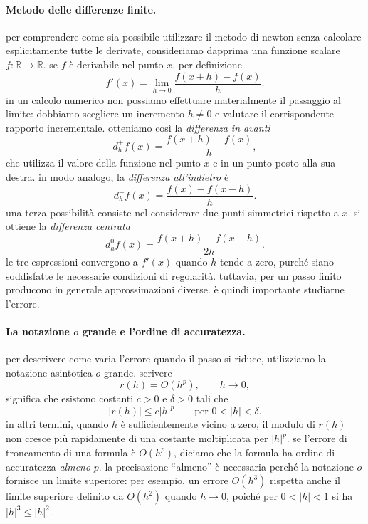 \paragraph{Metodo delle differenze finite.}
per comprendere come sia possibile utilizzare il metodo di newton senza calcolare esplicitamente tutte le derivate, consideriamo dapprima una funzione scalare $f:\mathbb{R}\to\mathbb{R}$. se $f$ è derivabile nel punto $x$, per definizione
\begin{equation*}
 f'(x)=\lim_{h\to 0}\frac{f(x+h)-f(x)}{h}.
 \label{eq:derivata_definizione}
\end{equation*}
in un calcolo numerico non possiamo effettuare materialmente il passaggio al limite: dobbiamo scegliere un incremento $h\neq 0$ e valutare il corrispondente rapporto incrementale. otteniamo così la \emph{differenza in avanti}
\begin{equation*}
 d_h^+f(x)=\frac{f(x+h)-f(x)}{h},
 \label{eq:diff_avanti}
\end{equation*}
che utilizza il valore della funzione nel punto $x$ e in un punto posto alla sua destra. in modo analogo, la \emph{differenza all'indietro} è
\begin{equation*}
 d_h^-f(x)=\frac{f(x)-f(x-h)}{h}.
 \label{eq:diff_indietro}
\end{equation*}
una terza possibilità consiste nel considerare due punti simmetrici rispetto a $x$. si ottiene la \emph{differenza centrata}
\begin{equation*}
 d_h^0f(x)=\frac{f(x+h)-f(x-h)}{2h}.
 \label{eq:diff_centrata}
\end{equation*}
le tre espressioni convergono a $f'(x)$ quando $h$ tende a zero, purché siano soddisfatte le necessarie condizioni di regolarità. tuttavia, per un passo finito producono in generale approssimazioni diverse. è quindi importante studiarne l'errore.

\paragraph{La notazione $o$ grande e l'ordine di accuratezza.}
per descrivere come varia l'errore quando il passo si riduce, utilizziamo la notazione asintotica $o$ grande. scrivere
\begin{equation*}
 r(h)=O(h^p),\qquad h\to 0,
 \label{eq:big_o_def}
\end{equation*}
significa che esistono costanti $c>0$ e $\delta>0$ tali che
\begin{equation*}
 |r(h)|\leq c|h|^p
 \qquad\text{per }0<|h|<\delta.
 \label{eq:big_o_disuguaglianza}
\end{equation*}
in altri termini, quando $h$ è sufficientemente vicino a zero, il modulo di $r(h)$ non cresce più rapidamente di una costante moltiplicata per $|h|^p$. se l'errore di troncamento di una formula è $O(h^p)$, diciamo che la formula ha ordine di accuratezza \emph{almeno} $p$. la precisazione ``almeno'' è necessaria perché la notazione $o$ fornisce un limite superiore: 
per esempio, un errore \(O(h^3)\) rispetta anche il limite superiore definito da \(O(h^2)\) quando \(h\to 0\), poiché per \(0<|h|<1\) si ha \(|h|^3\leq |h|^2\).

